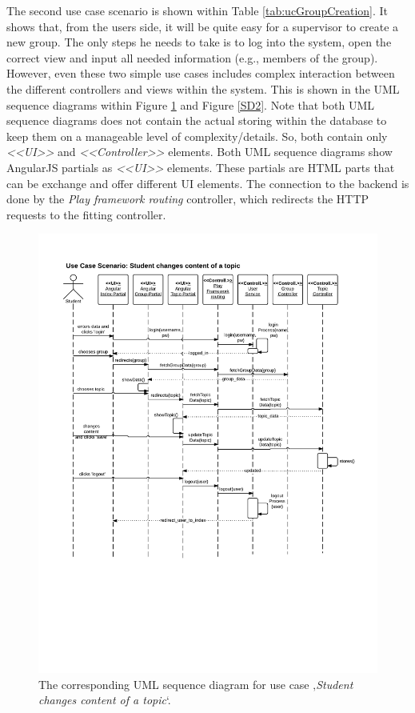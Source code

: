 The second use case scenario is shown within Table \ref{tab:ucGroupCreation}. It shows that, from the users side, it will be quite easy for a supervisor to create a new group. The only steps he needs to take is to log into the system, open the correct view and input all needed information (e.g., members of the group). However, even these two simple use cases includes complex interaction between the different controllers and views within the system. This is shown in the \ac{UML} sequence diagrams within Figure \ref{SD1} and Figure \ref{SD2}. Note that both \ac{UML} sequence diagrams does not contain the actual storing within the database to keep them on a manageable level of complexity/details. So, both contain only \emph{<<UI>>} and \emph{<<Controller>>} elements. Both \ac{UML} sequence diagrams show AngularJS partials as \emph{<<UI>>} elements. These partials are \ac{HTML} parts that can be exchange and offer different \ac{UI} elements. The connection to the backend is done by the \emph{Play framework routing} controller, which redirects the \ac{HTTP} requests to the fitting controller.

\begin{figure}[th]
\centerline{\includegraphics[width=1\textwidth]{gfx/SDChangeContent}}
\caption{The corresponding \ac{UML} sequence diagram for use case ‚\emph{Student changes content of a topic}‘.}
\label{SD1}
\end{figure} 

